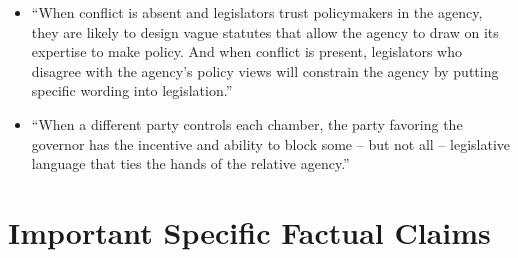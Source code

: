 \documentclass[12pt]{article}
\begin{document}
\begin{itemize}[leftmargin=*, itemsep=4pt]
    \begin{itemize}
        \item As policy conflict between politicians and bureaucrats increases, or as legislative capacity increases, the relative value to politicians of low-discretion statutes increases.
        \item Whether the model predicts a direct or interactive effect of these two variables on discretion depends on the distribution of legislative capacity and policy conflict among the political systems that are analyzed. If there are a large number of political systems that never have sufficient capacity to adopt a low-discretion law, then we should expect interactive effects (where, for example, legislative capacity influences the design of statutes only if the level of policy conflict is sufficiently high). By contrast, if a large numbere of political systems have high legislative capacity, the effects of these two variables should be direct.
        \item As the ability of politicians to rely on nonstatutory factors to achieve policy objectives increases, the relative value of low-discretion laws declines.
        \item These results hold in parliamentary and presidential systems.
        \item In presidential systems, bicameral conflict often leads to more discretion.
    \end{itemize}
    \item ``When conflict is absent and legislators trust policymakers in the agency, they are likely to design vague statutes that allow the agency to draw on its expertise to make policy. And when conflict is present, legislators who disagree with the agency's policy views will constrain the agency by putting specific wording into legislation.''
    \item ``When a different party controls each chamber, the party favoring the governor has the incentive and ability to block some -- but not all -- legislative language that ties the hands of the relative agency.''
\end{itemize}


\section{Important Specific Factual Claims}
\end{document}
